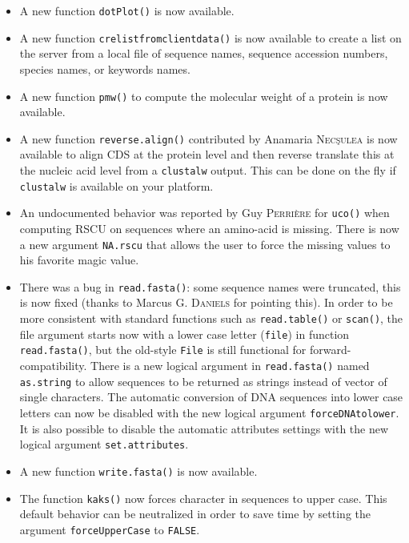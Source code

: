 \documentclass{article}
\begin{document}
\begin{itemize}

\item A  new function \texttt{dotPlot()} is now available.

\item A new function \texttt{crelistfromclientdata()} is now available to
create a list on the server from a local file of sequence names, sequence
accession numbers, species names, or keywords names.

\item A new function \texttt{pmw()} to compute the molecular weight of
a protein is now available.

\item A new function \texttt{reverse.align()} contributed by Anamaria \textsc{Nec\c{s}ulea}
is now available to align CDS at the protein level and then reverse translate this at
the nucleic acid level from a \texttt{clustalw} output. This can be done on the fly
if \texttt{clustalw} is available on your platform.

\item An undocumented behavior was reported by Guy \textsc{Perri{\`e}re} for \texttt{uco()}
when computing RSCU on sequences where an amino-acid is missing. There is
now a new argument \texttt{NA.rscu} that allows the user to force the
missing values to his favorite magic value.

\item There was a bug in \texttt{read.fasta()}: some sequence names were
truncated, this is now fixed (thanks to Marcus G. \textsc{Daniels} for pointing this).
In order to be more consistent with standard functions such as \texttt{read.table()}
or \texttt{scan()}, the file argument starts now with a lower case letter (\texttt{file})
in function \texttt{read.fasta()}, but the old-style \texttt{File} is still
functional for forward-compatibility. There is a new logical argument in \texttt{read.fasta()}
named \texttt{as.string} to allow sequences to be returned as strings instead of
vector of single characters. The automatic conversion of DNA sequences into
lower case letters can now be disabled with the new logical argument
\texttt{forceDNAtolower}. It is also possible to disable the automatic attributes
settings with the new logical argument \texttt{set.attributes}.

\item A new function \texttt{write.fasta()} is now available.

\item The function \texttt{kaks()} now forces character in sequences to upper case.
This default behavior can be neutralized in order to save time by setting the 
argument \texttt{forceUpperCase} to \texttt{FALSE}.

\end{itemize}
\end{document}
